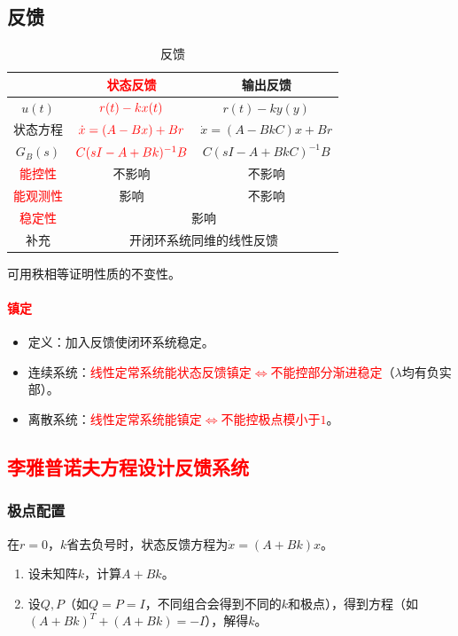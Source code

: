 \documentclass[
12pt, %
a4paper, 
oneside, %
]{scrartcl}
\begin{document}
\subsection[反馈]{反馈}
\begin{table}[H]
\centering
\begin{tabular}{|c|c|c|}
\hline
 & \textcolor{red}{状态反馈} & 输出反馈 \\
\hline
$ u(t) $ & $ \textcolor{red}{r(t) - k x(t)} $ & $ r(t) - k y(y) $ \\
\hline
状态方程 & $ \textcolor{red}{\dot{x} = (A - B x) + B r} $ & $ \dot{x} = (A - B k C)x + B r $ \\
\hline
$ G_B(s) $ & $\textcolor{red}{C (sI - A + B k)^{-1} B} $ & $ C (sI - A + B k C)^{-1} B $ \\
\hline
\textcolor{red}{能控性} & 不影响 & 不影响 \\
\hline
\textcolor{red}{能观测性} & 影响 & 不影响 \\
\hline
\textcolor{red}{稳定性} & \multicolumn{2}{c|}{影响} \\
\hline
补充 & \multicolumn{2}{c|}{开闭环系统同维的线性反馈} \\
\hline
\end{tabular}
\caption{反馈}
\end{table}

可用秩相等证明性质的不变性。
\paragraph{\textcolor{red}{镇定}}
\begin{itemize}
\item 定义：加入反馈使闭环系统稳定。
\item 连续系统：\textcolor{red}{线性定常系统能状态反馈镇定$ \Leftrightarrow $不能控部分渐进稳定}（$ \lambda $均有负实部）。
\item 离散系统：\textcolor{red}{线性定常系统能镇定$ \Leftrightarrow $不能控极点模小于$ 1 $}。
\end{itemize}
\subsection[李雅普诺夫方程设计反馈系统]{\textcolor{red}{李雅普诺夫方程设计反馈系统}}
\subsubsection[极点配置]{极点配置}
在$ r = 0 $，$ k $省去负号时，状态反馈方程为$ \dot{x} = (A + B k)x $。
\begin{enumerate}
\item 设未知阵$ k $，计算$ A + B k $。
\item 设$ Q, P $（如$ Q = P = I $，不同组合会得到不同的$ k $和极点），得到方程（如$ (A + B k)^T + (A + B k) = -I $），解得$ k $。
\end{enumerate}
\end{document}

